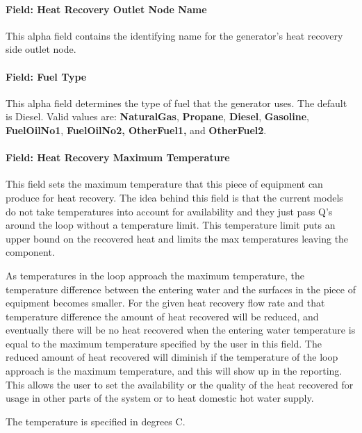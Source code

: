 \paragraph{Field: Heat Recovery Outlet Node Name}\label{field-heat-recovery-outlet-node-name}

This alpha field contains the identifying name for the generator's heat recovery side outlet node.

\paragraph{Field: Fuel Type}\label{field-fuel-type}

This alpha field determines the type of fuel that the generator uses. The default is Diesel. Valid values are: \textbf{NaturalGas}, \textbf{Propane}, \textbf{Diesel}, \textbf{Gasoline}, \textbf{FuelOilNo1}, \textbf{FuelOilNo2, OtherFuel1,} and \textbf{OtherFuel2}.

\paragraph{Field: Heat Recovery Maximum Temperature}\label{field-heat-recovery-maximum-temperature}

This field sets the maximum temperature that this piece of equipment can produce for heat recovery. The idea behind this field is that the current models do not take temperatures into account for availability and they just pass Q's around the loop without a temperature limit. This temperature limit puts an upper bound on the recovered heat and limits the max temperatures leaving the component.

As temperatures in the loop approach the maximum temperature, the temperature difference between the entering water and the surfaces in the piece of equipment becomes smaller. For the given heat recovery flow rate and that temperature difference the amount of heat recovered will be reduced, and eventually there will be no heat recovered when the entering water temperature is equal to the maximum temperature specified by the user in this field. The reduced amount of heat recovered will diminish if the temperature of the loop approach is the maximum temperature, and this will show up in the reporting. This allows the user to set the availability or the quality of the heat recovered for usage in other parts of the system or to heat domestic hot water supply.

The temperature is specified in degrees C.


